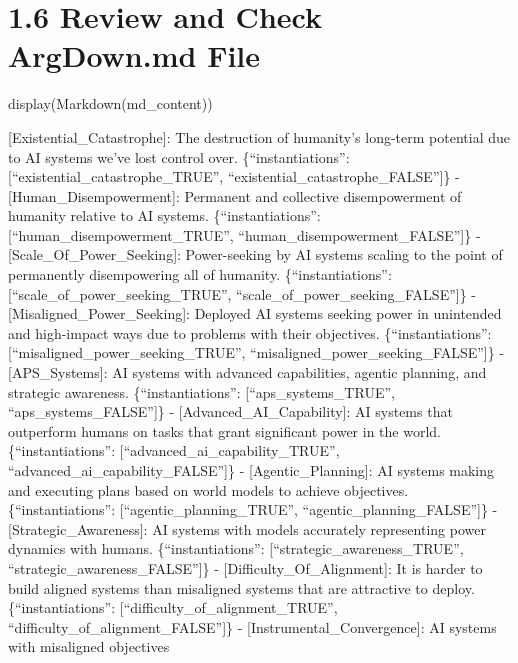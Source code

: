 \documentclass[
  11pt,
  letterpaper,
]{book}
\newenvironment{Shaded}{\begin{snugshade}}{\end{snugshade}}
\newcommand{\NormalTok}[1]{\textcolor[rgb]{0.00,0.23,0.31}{#1}}
\begin{document}
\section{1.6 Review and Check ArgDown.md
File}\label{review-and-check-argdown.md-file}

\begin{Shaded}
\begin{Highlighting}[]
\NormalTok{display(Markdown(md\_content))}
\end{Highlighting}
\end{Shaded}

{[}Existential\_Catastrophe{]}: The destruction of humanity's long-term
potential due to AI systems we've lost control over.
\{``instantiations'': {[}``existential\_catastrophe\_TRUE'',
``existential\_catastrophe\_FALSE''{]}\} - {[}Human\_Disempowerment{]}:
Permanent and collective disempowerment of humanity relative to AI
systems. \{``instantiations'': {[}``human\_disempowerment\_TRUE'',
``human\_disempowerment\_FALSE''{]}\} - {[}Scale\_Of\_Power\_Seeking{]}:
Power-seeking by AI systems scaling to the point of permanently
disempowering all of humanity. \{``instantiations'':
{[}``scale\_of\_power\_seeking\_TRUE'',
``scale\_of\_power\_seeking\_FALSE''{]}\} -
{[}Misaligned\_Power\_Seeking{]}: Deployed AI systems seeking power in
unintended and high-impact ways due to problems with their objectives.
\{``instantiations'': {[}``misaligned\_power\_seeking\_TRUE'',
``misaligned\_power\_seeking\_FALSE''{]}\} - {[}APS\_Systems{]}: AI
systems with advanced capabilities, agentic planning, and strategic
awareness. \{``instantiations'': {[}``aps\_systems\_TRUE'',
``aps\_systems\_FALSE''{]}\} - {[}Advanced\_AI\_Capability{]}: AI
systems that outperform humans on tasks that grant significant power in
the world. \{``instantiations'': {[}``advanced\_ai\_capability\_TRUE'',
``advanced\_ai\_capability\_FALSE''{]}\} - {[}Agentic\_Planning{]}: AI
systems making and executing plans based on world models to achieve
objectives. \{``instantiations'': {[}``agentic\_planning\_TRUE'',
``agentic\_planning\_FALSE''{]}\} - {[}Strategic\_Awareness{]}: AI
systems with models accurately representing power dynamics with humans.
\{``instantiations'': {[}``strategic\_awareness\_TRUE'',
``strategic\_awareness\_FALSE''{]}\} - {[}Difficulty\_Of\_Alignment{]}:
It is harder to build aligned systems than misaligned systems that are
attractive to deploy. \{``instantiations'':
{[}``difficulty\_of\_alignment\_TRUE'',
``difficulty\_of\_alignment\_FALSE''{]}\} -
{[}Instrumental\_Convergence{]}: AI systems with misaligned objectives
\end{document}
